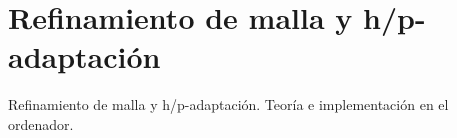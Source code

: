 
\section{Refinamiento de malla y h/p-adaptación}

\begin{contenidos}
Refinamiento de malla y h/p-adaptación. Teoría e implementación en el ordenador.
\end{contenidos}



